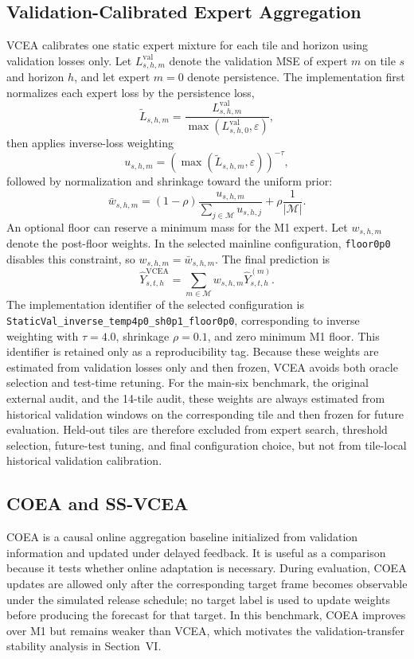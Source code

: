 \documentclass[lettersize,journal]{IEEEtran}
\begin{document}
\subsection{Validation-Calibrated Expert Aggregation}
VCEA calibrates one static expert mixture for each tile and horizon using validation losses only. Let $L^{\mathrm{val}}_{s,h,m}$ denote the validation MSE of expert $m$ on tile $s$ and horizon $h$, and let expert $m=0$ denote persistence. The implementation first normalizes each expert loss by the persistence loss,
\begin{equation}
\tilde{L}_{s,h,m}=\frac{L^{\mathrm{val}}_{s,h,m}}{\max(L^{\mathrm{val}}_{s,h,0},\varepsilon)},
\end{equation}
then applies inverse-loss weighting
\begin{equation}
u_{s,h,m}=\left(\max(\tilde{L}_{s,h,m},\varepsilon)\right)^{-\tau},
\end{equation}
followed by normalization and shrinkage toward the uniform prior:
\begin{equation}
\bar{w}_{s,h,m}=(1-\rho)\frac{u_{s,h,m}}{\sum_{j\in\mathcal{M}}u_{s,h,j}}+\rho\frac{1}{|\mathcal{M}|}.
\end{equation}
An optional floor can reserve a minimum mass for the M1 expert. Let $w_{s,h,m}$ denote the post-floor weights. In the selected mainline configuration, \texttt{floor0p0} disables this constraint, so $w_{s,h,m}=\bar{w}_{s,h,m}$. The final prediction is
\begin{equation}
\hat{Y}^{\mathrm{VCEA}}_{s,t,h}=\sum_{m\in\mathcal{M}} w_{s,h,m}\hat{Y}^{(m)}_{s,t,h}.
\end{equation}
The implementation identifier of the selected configuration is \texttt{StaticVal\_inverse\_temp4p0\_sh0p1\_floor0p0}, corresponding to inverse weighting with $\tau=4.0$, shrinkage $\rho=0.1$, and zero minimum M1 floor. This identifier is retained only as a reproducibility tag. Because these weights are estimated from validation losses only and then frozen, VCEA avoids both oracle selection and test-time retuning.
For the main-six benchmark, the original external audit, and the 14-tile audit, these weights are always estimated from historical validation windows on the corresponding tile and then frozen for future evaluation. Held-out tiles are therefore excluded from expert search, threshold selection, future-test tuning, and final configuration choice, but not from tile-local historical validation calibration.

\subsection{COEA and SS-VCEA}
COEA is a causal online aggregation baseline initialized from validation information and updated under delayed feedback. It is useful as a comparison because it tests whether online adaptation is necessary. During evaluation, COEA updates are allowed only after the corresponding target frame becomes observable under the simulated release schedule; no target label is used to update weights before producing the forecast for that target. In this benchmark, COEA improves over M1 but remains weaker than VCEA, which motivates the validation-transfer stability analysis in Section~VI.
\end{document}
